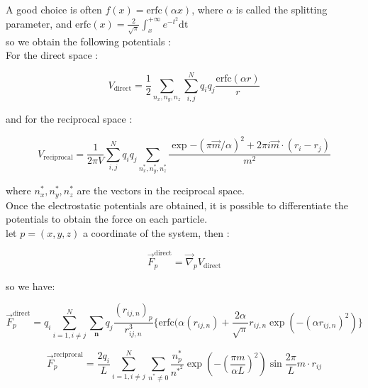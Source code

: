 \documentclass[11pt,twoside,a4paper]{report}
\begin{document}
A good choice is often $f(x) = \text{erfc}(\alpha x)$, where $\alpha$ is called the splitting parameter, and $\text{erfc}(x) = \frac{2}{\sqrt{\pi}} \int_{x}^{+\infty}{e^{-t^2}\text{dt}} $\\

so we obtain the following potentials :\\

For the direct space :

\begin{equation}
   V_{\text{direct}} =  \frac{1}{2} \sum_{n_x,n_y,n_z} \sum_{i,j}^{N} q_i q_j \frac{\text{erfc}(\alpha r)}{r}
\end{equation}

and for the reciprocal space :

\begin{equation}
\label{Vrecip}
	V_{\text{reciprocal}} = \frac{1}{2 \pi V} \sum_{i,j}^{N} q_i q_j \sum_{n_x^*,n_y^*,n_z^*}\frac{\exp{-(\pi \overrightarrow{m}/\alpha)^2} +2\pi i \overrightarrow{m} \cdot (r_i - r_j)}{m^2}
\end{equation}

where $n_x^*,n_y^*,n_z^*$ are the vectors in the reciprocal space.\\


Once the electrostatic potentials are obtained, it is possible to differentiate the potentials to obtain the force on each particle.\\

let $p = (x,y,z)$ a coordinate of the system, then :


\begin{equation}
   \overrightarrow{F}_p^{\text{direct}} = \overrightarrow{\nabla}_p V_{\text{direct}} 
\end{equation}


so we have:

\begin{equation}
\label{ewaldDirect}
   \overrightarrow{F}_p^{\text{direct}} = q_i \sum\limits_{i=1,i\neq j}^N \sum\limits_{\textbf{n}} q_j \frac{(r_{ij,n})_p}{r_{ij,n}^3}
   \{\text{erfc}(\alpha (r_{ij,n}) + \frac{2\alpha}{\sqrt{\pi}} r_{ij,n} \exp(-(\alpha r_{ij,n})^2)\}
\end{equation}


\begin{equation}
\label{ewaldReciprocal}
   \overrightarrow{F}_p^{\text{reciprocal}} = \frac{2 q_i}{L} \sum\limits_{i=1,i\neq j}^N \sum_{n^* \neq 0} \frac{n_p^*}{n^{*^2}} \exp{(-(\frac{\pi m}{\alpha L})^2)}\sin{\frac{2\pi}{L} m \cdot r_{ij} }
\end{equation}
\end{document}
